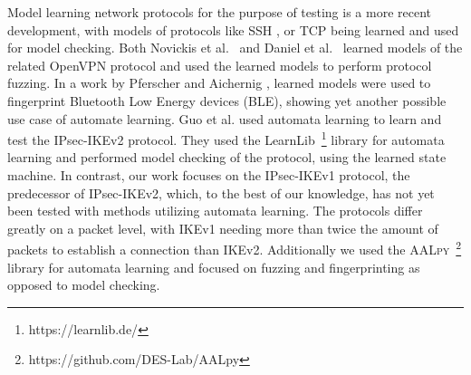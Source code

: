 Model learning network protocols for the purpose of testing is a more recent development, with models of protocols like SSH \cite{fiteruau2017model}, or TCP \textcite{fiteruau2016combining} being learned and used for model checking. Both Novickis et al.~\textcite{novickis2016protocol} and Daniel et al.~\textcite{daniel2018inferring} learned models of the related OpenVPN protocol and used the learned models to perform protocol fuzzing. In a work by Pferscher and Aichernig \textcite{pferscher2021fingerprinting}, learned models were used to fingerprint Bluetooth Low Energy devices (BLE), showing yet another possible use case of automate learning. Guo et al. \cite{guo2019model} used automata learning to learn and test the IPsec-IKEv2 protocol. They used the LearnLib~\footnote{https://learnlib.de/} library for automata learning and performed model checking of the protocol, using the learned state machine. In contrast, our work focuses on the IPsec-IKEv1 protocol, the predecessor of IPsec-IKEv2, which, to the best of our knowledge, has not yet been tested with methods utilizing automata learning. The protocols differ greatly on a packet level, with IKEv1 needing more than twice the amount of packets to establish a connection than IKEv2.
Additionally we used the \textsc{AALpy}~\footnote{https://github.com/DES-Lab/AALpy} library for automata learning and focused on fuzzing and fingerprinting as opposed to model checking.
